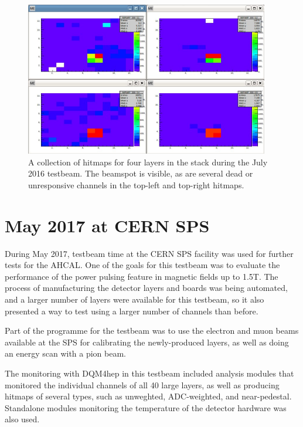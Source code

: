 \begin{figure}[p]
	\centering
	\includegraphics[width=0.95\textwidth]{../Pictures/AHCALHitmapFour.png}
	\caption{A collection of hitmaps for four layers in the stack during the July 2016 testbeam. The beamspot is visible, as are several dead or unresponsive channels in the top-left and top-right hitmaps.}
	\label{figure:aida/july2016/four-hitmap}
\end{figure}


\section{May 2017 at CERN SPS} %
During May 2017, testbeam time at the \acrshort{CERN} \acrfull{SPS} facility was used for further tests for the \acrshort{AHCAL}. One of the goals for this testbeam was to evaluate the performance of the power pulsing feature in magnetic fields up to 1.5T. The process of manufacturing the detector layers and boards was being automated, and a larger number of layers were available for this testbeam, so it also presented a way to test using a larger number of channels than before. 

Part of the programme for the testbeam was to use the electron and muon beams available at the \acrshort{SPS} for calibrating the newly-produced layers, as well as doing an energy scan with a pion beam.

The monitoring with \acrshort{DQM4hep} in this testbeam included analysis modules that monitored the individual channels of all 40 large layers, as well as producing hitmaps of several types, such as unweghted, \acrshort{ADC}-weighted, and near-pedestal. Standalone modules monitoring the temperature of the detector hardware was also used. 

